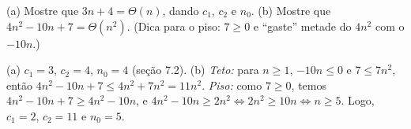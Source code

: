 \begin{exrapido}
(a) Mostre que $3n + 4 = \Theta(n)$, dando $c_1$, $c_2$ e $n_0$. (b) Mostre que
$4n^2 - 10n + 7 = \Theta(n^2)$. (Dica para o piso: $7 \ge 0$ e \enquote{gaste} metade do $4n^2$
com o $-10n$.)
\end{exrapido}

\begin{respostas}
   (a) $c_1 = 3$, $c_2 = 4$, $n_0 = 4$ (seção 7.2).
  (b) \emph{Teto:} para $n \ge 1$, $-10n \le 0$ e $7 \le 7n^2$, então $4n^2 - 10n + 7 \le 4n^2 + 7n^2 = 11n^2$.
  \emph{Piso:} como $7 \ge 0$, temos $4n^2 - 10n + 7 \ge 4n^2 - 10n$, e
  $4n^2 - 10n \ge 2n^2 \Longleftrightarrow 2n^2 \ge 10n \Longleftrightarrow n \ge 5$.
  Logo, $c_1 = 2$, $c_2 = 11$ e $n_0 = 5$.
\end{respostas}
